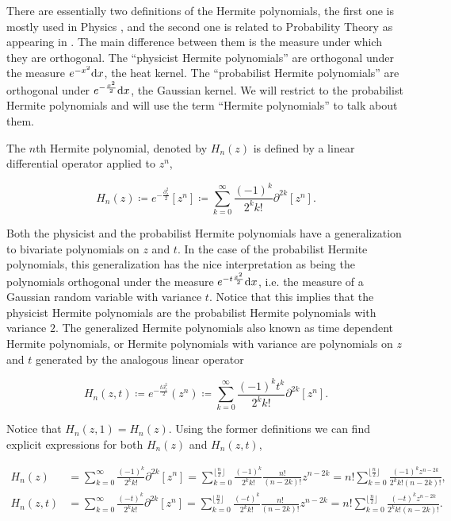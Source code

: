 There are essentially two definitions of the Hermite polynomials, the first one is mostly used in Physics \cite{book:mathematical_methods_for_physicists}, and the second one is related to Probability Theory as appearing in \cite{marcus2021polynomial}. The main difference between them is the measure under which they are orthogonal. The ``physicist Hermite polynomials'' are orthogonal under the measure $e^{-x^2}\mathrm d x$, the heat kernel. The ``probabilist Hermite polynomials'' are orthogonal under $e^{-\frac{x^2}{2}} \mathrm d x$, the Gaussian kernel. We will restrict to the probabilist Hermite polynomials and will use the term ``Hermite polynomials'' to talk about them.

The $n$th Hermite polynomial, denoted by $H_n(z)$ is defined by a linear differential operator applied to $z^n$,

\begin{equation}
    H_n(z) \coloneqq e^{-\frac{\partial_z^2}{2}}[z^n] \coloneqq \sum_{k=0}^\infty \frac{(-1)^k}{2^k k!} \partial^{2k}[z^n].
\end{equation}

Both the physicist and the probabilist Hermite polynomials have a generalization to bivariate polynomials on $z$ and $t$. In the case of the probabilist Hermite polynomials, this generalization has the nice interpretation as being the polynomials orthogonal under the measure $e^{-t\frac{x^2}{2}}\mathrm d x$, i.e. the measure of a Gaussian random variable with variance $t$. Notice that this implies that the physicist Hermite polynomials are the probabilist Hermite polynomials with variance $2$. The generalized Hermite polynomials also known as time dependent Hermite polynomials, or Hermite polynomials with variance are polynomials on $z$ and $t$ generated by the analogous linear operator

\begin{equation}
    H_n(z,t) \coloneqq e^{-\frac{t\partial_z^2}{2}}(z^n) \coloneqq \sum_{k=0}^\infty \frac{(-1)^kt^k}{2^k k!} \partial^{2k}[z^n].
\end{equation}

Notice that $H_n(z,1)=H_n(z)$. Using the former definitions we can find explicit expressions for both $H_n(z)$ and $H_n(z,t)$,

\begin{align*}
    H_n(z) &= \sum_{k=0}^\infty \frac{(-1)^k}{2^k k!} \partial^{2k}[z^n] = \sum_{k=0}^{\lfloor \frac n2 \rfloor} \frac{(-1)^k}{2^k k!} \frac{n! }{(n-2k)!}z^{n-2k} = n! \sum_{k=0}^{\lfloor \frac n2\rfloor} \frac{(-1)^k z^{n-2k}}{2^k k! (n-2k)!}, \\
    H_n(z,t) &= \sum_{k=0}^\infty \frac{(-t)^k}{2^k k!} \partial^{2k}[z^n] = \sum_{k=0}^{\lfloor \frac n2 \rfloor} \frac{(-t)^k}{2^k k!} \frac{n! }{(n-2k)!}z^{n-2k} = n! \sum_{k=0}^{\lfloor \frac n2\rfloor} \frac{(-t)^k z^{n-2k}}{2^k k! (n-2k)!}.
\end{align*}

